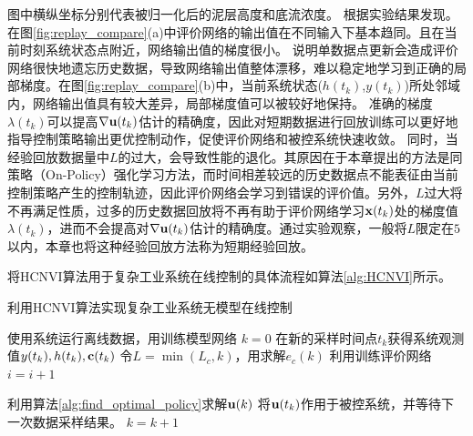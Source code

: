 图中横纵坐标分别代表被归一化后的泥层高度和底流浓度。
根据实验结果发现。在图\ref{fig:replay_compare}(a)中评价网络的输出值在不同输入下基本趋同。且在当前时刻系统状态点附近，网络输出值的梯度很小。
说明单数据点更新会造成评价网络很快地遗忘历史数据，导致网络输出值整体漂移，难以稳定地学习到正确的局部梯度。在图\ref{fig:replay_compare}(b)中，当前系统状态($h(t_k)$,$y(t_k)$)所处邻域内，网络输出值具有较大差异，局部梯度值可以被较好地保持。
准确的梯度$\lambda(t_k)$可以提高$\nabla \mathbf
u(t_k)$估计的精确度，因此对短期数据进行回放训练可以更好地指导控制策略输出更优控制动作，促使评价网络和被控系统快速收敛。
同时，当经验回放数据量中$L$的过大，会导致性能的退化。其原因在于本章提出的方法是同策略（On-Policy）强化学习方法，而时间相差较远的历史数据点不能表征由当前控制策略产生的控制轨迹，因此评价网络会学习到错误的评价值。另外，$L$过大将不再满足性质，过多的历史数据回放将不再有助于评价网络学习$\mathbf
x(t_k)$处的梯度值$\lambda(t_k)$，进而不会提高对$\nabla \mathbf
u(t_k)$估计的精确度。通过实验观察，一般将$L$限定在$5$以内，本章也将这种经验回放方法称为短期经验回放。



将HCNVI算法用于复杂工业系统在线控制的具体流程如算法\ref{alg:HCNVI}所示。

\begin{algorithm}[htb]

\caption{利用HCNVI算法实现复杂工业系统无模型在线控制} %
\label{alg:HCNVI}

\begin{algorithmic}[1]


\State
使用系统运行离线数据，用训练模型网络
\State $k=0$ 
\State 在新的采样时间点$t_k$获得系统观测值$y(t_k), h(t_k),\mathbf c(t_k)$
\Do
    \State 令$L=\min(L_c, k)$，用求解$e_c(k)$
    \State 利用训练评价网络
    \State $i=i+1$

\State 利用算法\ref{alg:find_optimal_policy}求解${\mathbf u}(k)$ \State
将${\mathbf u}(t_k)$作用于被控系统，并等待下一次数据采样结果。 \State $k=k+1$

\EndWhile
\end{algorithmic}

\end{algorithm}

